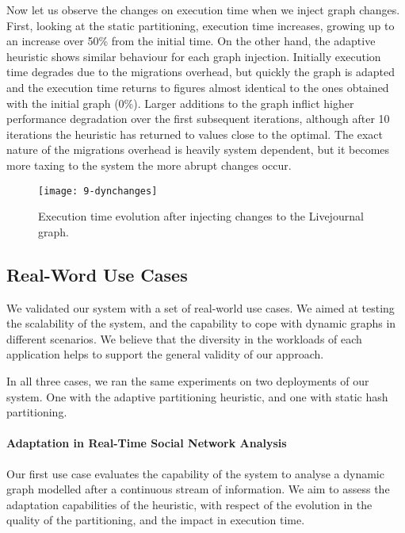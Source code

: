 \documentclass{sig-alternate-10pt}
\begin{document}
Now let us observe the changes on execution time when we inject graph changes. First, looking at the static partitioning, execution time increases, growing up to an increase over 50\% from the initial time. On the other hand, the adaptive heuristic shows similar behaviour for each graph injection. Initially execution time degrades due to the migrations overhead, but quickly the graph is adapted  and the execution time returns to figures almost identical to the ones obtained with the initial graph (0\%). Larger additions to the graph inflict higher performance degradation over the first subsequent iterations, although after 10 iterations the heuristic has returned to values close to the optimal. The exact nature of the migrations overhead is heavily system dependent, but it becomes more taxing to the system the more abrupt changes occur.

\begin{figure}
  \centering
    \texttt{[image: 9-dynchanges]}
    \vspace{-5pt}
  \caption{ Execution time evolution after injecting changes to the Livejournal graph. }
 	\vspace{-15pt}
  \label{fig:livejournal}
\end{figure}



\subsection{Real-Word Use Cases}
\label{subsec:usecases}

We validated our system with a set of real-world use cases. We aimed at testing the scalability of the system, and the capability to cope with dynamic graphs in different scenarios.  We believe that the diversity in the workloads of each application helps to support the general validity of our approach.

In all three cases, we ran the same experiments on two deployments of our system. One with the adaptive partitioning heuristic, and one with static hash partitioning. 

\paragraph{\textbf{Adaptation in Real-Time Social Network Analysis}}

Our first use case evaluates the capability of the system to analyse a dynamic graph modelled after a continuous stream of information. We aim to assess the adaptation capabilities of the heuristic, with respect of the evolution in the quality of the partitioning, and the impact in execution time. 
\end{document}
